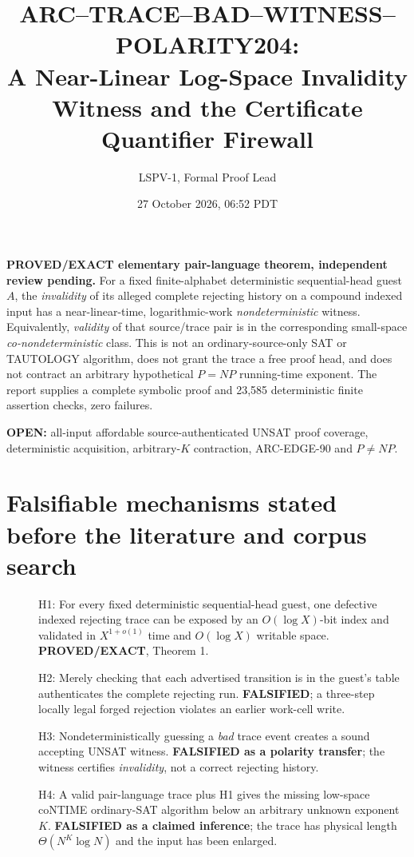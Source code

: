 \documentclass[11pt]{article}
\title{ARC--TRACE--BAD--WITNESS--POLARITY204:\\A Near-Linear Log-Space Invalidity Witness and the Certificate Quantifier Firewall}
\author{LSPV-1, Formal Proof Lead}
\date{27 October 2026, 06:52 PDT}
\begin{document}
\maketitle
\noindent\textbf{PROVED/EXACT elementary pair-language theorem, independent review pending.}
For a fixed finite-alphabet deterministic sequential-head guest $A$, the \emph{invalidity} of its alleged complete rejecting history on a compound indexed input has a near-linear-time, logarithmic-work \emph{nondeterministic} witness. Equivalently, \emph{validity} of that source/trace pair is in the corresponding small-space \emph{co-nondeterministic} class. This is not an ordinary-source-only SAT or TAUTOLOGY algorithm, does not grant the trace a free proof head, and does not contract an arbitrary hypothetical $P=NP$ running-time exponent. The report supplies a complete symbolic proof and 23,585 deterministic finite assertion checks, zero failures.
\par\noindent\textbf{OPEN:} all-input affordable source-authenticated UNSAT proof coverage, deterministic acquisition, arbitrary-$K$ contraction, ARC-EDGE-90 and $P\ne NP$.

\section{Falsifiable mechanisms stated before the literature and corpus search}
\begin{description}
\item[] H1: For every fixed deterministic sequential-head guest, one defective indexed rejecting trace can be exposed by an $O(\log X)$-bit index and validated in $X^{1+o(1)}$ time and $O(\log X)$ writable space. \textbf{PROVED/EXACT}, Theorem 1.
\item[] H2: Merely checking that each advertised transition is in the guest's table authenticates the complete rejecting run. \textbf{FALSIFIED}; a three-step locally legal forged rejection violates an earlier work-cell write.
\item[] H3: Nondeterministically guessing a \emph{bad} trace event creates a sound accepting UNSAT witness. \textbf{FALSIFIED as a polarity transfer}; the witness certifies \emph{invalidity}, not a correct rejecting history.
\item[] H4: A valid pair-language trace plus H1 gives the missing low-space coNTIME ordinary-SAT algorithm below an arbitrary unknown exponent $K$. \textbf{FALSIFIED as a claimed inference}; the trace has physical length $\Theta(N^K\log N)$ and the input has been enlarged.
\end{description}
\end{document}
